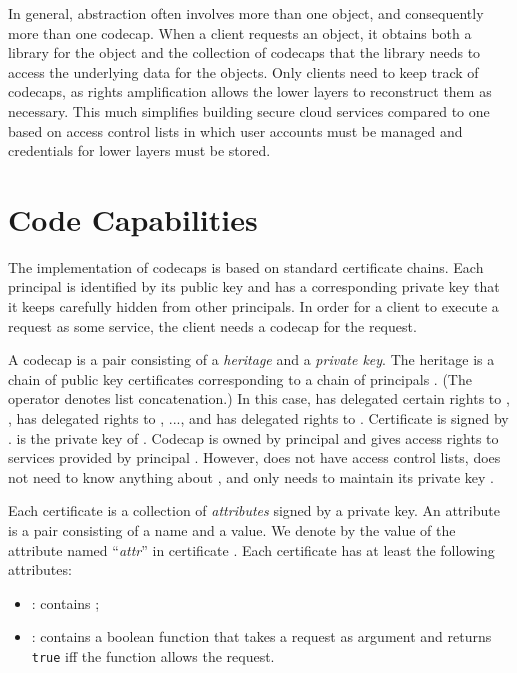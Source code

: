 \documentclass[10pt, conference, compsocconf]{IEEEtran}
\begin{document}
In general, abstraction often involves more than one object, and
consequently more than one codecap.  When a client requests an
object, it obtains both a library for the object and the collection
of codecaps that the library needs to access the underlying data
for the objects.  Only clients need to keep track of codecaps, as
rights amplification allows the lower layers to reconstruct them
as necessary.  This much simplifies building secure cloud services
compared to one based on access control lists in which user accounts
must be managed and credentials for lower layers must be stored.



\section{Code Capabilities}

The implementation of codecaps is based on standard
certificate chains.
Each principal 
is identified by its public key 
and has a corresponding private key 
that it keeps carefully hidden from other principals.
In order for a client
to execute a request as some service, the client needs
a codecap for the request.

A codecap  is a pair  consisting of a
\emph{heritage} and a \emph{private key}.
The heritage  is a chain of public
key certificates  corresponding to a
chain of  principals .
(The operator  denotes list concatenation.)
In this case,  has delegated certain rights to , ,
has delegated rights to , ..., and  has
delegated rights to .
Certificate  is
signed by .
 is the private key of .
Codecap  is owned by principal  and gives access
rights to services provided by principal .
However,  does not have access control lists, does not need to
know anything about , and only needs to maintain its private
key .

Each certificate  is a collection of \emph{attributes} signed
by a private key.  An
attribute is a pair consisting of a name and a value.
We denote by  the value of the
attribute named ``\textit{attr}'' in certificate .
Each certificate  has at least the following attributes:

\begin{itemize}
\item : contains ;
\item :
contains a boolean function that
takes a request as argument and returns \texttt{true} iff the
function allows the request.
\end{itemize}
\end{document}

